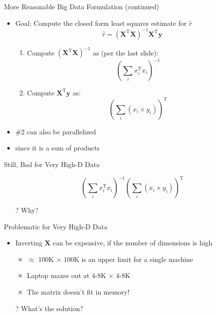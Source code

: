 \documentclass[aspectratio=169]{beamer}
\begin{document}
\begin{frame}{More Reasonable Big Data Formulation (continued)}

\begin{itemize}
	\item Goal: Compute the closed form least squares estimate for $\hat{r}$
			$$\hat{r} = (\textbf{X}^{\textrm{T}}\textbf{X})^{-1}\textbf{X}^{\textrm{T}}\textbf{y}$$
\begin{enumerate}
	\item Compute $(\textbf{X}^{\textrm{T}}\textbf{X})^{-1}$ as (per the last slide):
		$$\left( \sum_i x_i^{\textrm{T}} x_i \right)^{-1}$$
	\item Compute $\textbf{X}^{\textrm{T}}\textbf{y}$ as:
		$$\left( \sum_i (x_i \times y_i) \right)^{\textrm{T}}$$
\end{enumerate}
\item \#2 can also be parallelized
\item since it is a sum of products
\end{itemize}
\end{frame}
\begin{frame}{Still, Bad for Very High-D Data}

\begin{itemize}
	\item[] 	$$\left( \sum_i x_i^{\textrm{T}} x_i \right)^{-1} \left( \sum_i (x_i \times y_i) \right)^{\textrm{T}}$$

        \item[?] Why?
\end{itemize}

\end{frame}
\begin{frame}{Problematic for Very High-D Data}

\begin{itemize}
	\item Inverting $\textbf{X}$ can be expensive, if the number of dimensions is high
	\begin{itemize}
		\item $\approx$ 100K $\times$ 100K is an upper limit for a single machine
		\item Laptop maxes out at 4-8K $\times$ 4-8K
		\item The matrix doesn't fit in memory!
	\end{itemize}
	\vspace{2em}
	\item[?] What's the solution?
\end{itemize}
\end{frame}
\end{document}
